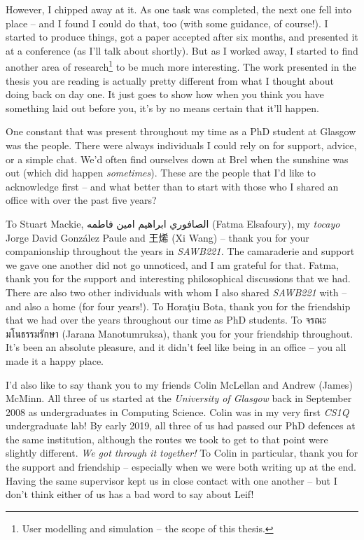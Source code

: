 \begin{preamble}
However, I chipped away at it. As one task was completed, the next one fell into place -- and I found I could do that, too (with some guidance, of course!). I started to produce things, got a paper accepted after six months, and presented it at a conference (as I'll talk about shortly). But as I worked away, I started to find another area of research\footnote{User modelling and simulation -- the scope of this thesis.} to be much more interesting. The work presented in the thesis you are reading is actually pretty different from what I thought about doing back on day one. It just goes to show how when you think you have something laid out before you, it's by no means certain that it'll happen.

One constant that was present throughout my time as a PhD student at Glasgow was the people. There were always individuals I could rely on for support, advice, or a simple chat. We'd often find ourselves down at Brel when the sunshine was out (which did happen \emph{sometimes}). These are the people that I'd like to acknowledge first -- and what better than to start with those who I shared an office with over the past five years?

To Stuart Mackie, {\arabicfont الصافوري ابراهيم امين فاطمه} (Fatma Elsafoury), my \emph{tocayo} Jorge David Gonz\'{a}lez Paule and {\asianfont 王烯} (Xi Wang) -- thank you for your companionship throughout the years in \emph{SAWB221.} The camaraderie and support we gave one another did not go unnoticed, and I am grateful for that. Fatma, thank you for the support and interesting philosophical discussions that we had. There are also two other individuals with whom I also shared \emph{SAWB221} with -- and also a home (for four years!). To Hora\c{t}iu Bota, thank you for the friendship that we had over the years throughout our time as PhD students. To {\thaifont \Large จรณะ มโนธรรมรักษา} (Jarana Manotumruksa), thank you for your friendship throughout. It's been an absolute pleasure, and it didn't feel like being in an office -- you all made it a happy place.

I'd also like to say thank you to my friends Colin McLellan and Andrew (James) McMinn. All three of us started at the \emph{University of Glasgow} back in September 2008 as undergraduates in Computing Science. Colin was in my very first \emph{CS1Q} undergraduate lab! By early 2019, all three of us had passed our PhD defences at the same institution, although the routes we took to get to that point were slightly different. \emph{We got through it together!} To Colin in particular, thank you for the support and friendship -- especially when we were both writing up at the end. Having the same supervisor kept us in close contact with one another -- but I don't think either of us has a bad word to say about Leif!


\end{preamble}
